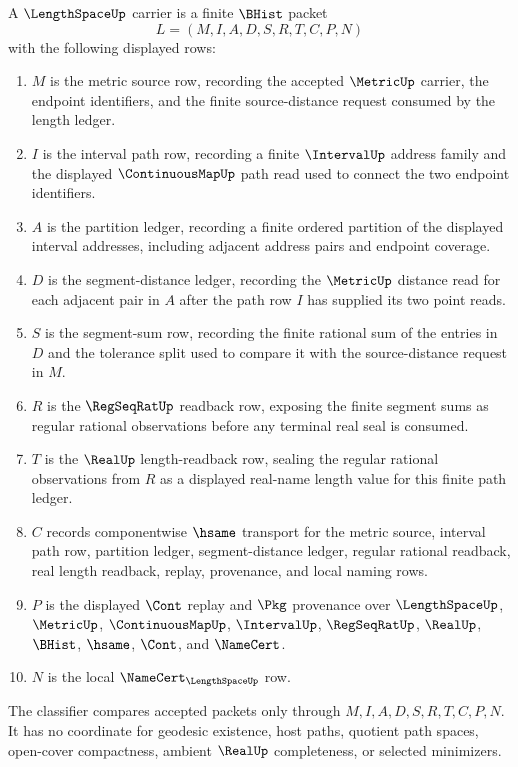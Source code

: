 \begin{definition}
\label{def:length-space-carrier}
A $\LengthSpaceUp$ carrier is a finite $\BHist$ packet
$$
L=(M,I,A,D,S,R,T,C,P,N)
$$
with the following displayed rows:
\begin{enumerate}
\item $M$ is the metric source row, recording the accepted $\MetricUp$ carrier, the endpoint identifiers, and the finite source-distance request consumed by the length ledger.
\item $I$ is the interval path row, recording a finite $\IntervalUp$ address family and the displayed $\ContinuousMapUp$ path read used to connect the two endpoint identifiers.
\item $A$ is the partition ledger, recording a finite ordered partition of the displayed interval addresses, including adjacent address pairs and endpoint coverage.
\item $D$ is the segment-distance ledger, recording the $\MetricUp$ distance read for each adjacent pair in $A$ after the path row $I$ has supplied its two point reads.
\item $S$ is the segment-sum row, recording the finite rational sum of the entries in $D$ and the tolerance split used to compare it with the source-distance request in $M$.
\item $R$ is the $\RegSeqRatUp$ readback row, exposing the finite segment sums as regular rational observations before any terminal real seal is consumed.
\item $T$ is the $\RealUp$ length-readback row, sealing the regular rational observations from $R$ as a displayed real-name length value for this finite path ledger.
\item $C$ records componentwise $\hsame$ transport for the metric source, interval path row, partition ledger, segment-distance ledger, regular rational readback, real length readback, replay, provenance, and local naming rows.
\item $P$ is the displayed $\Cont$ replay and $\Pkg$ provenance over $\LengthSpaceUp$, $\MetricUp$, $\ContinuousMapUp$, $\IntervalUp$, $\RegSeqRatUp$, $\RealUp$, $\BHist$, $\hsame$, $\Cont$, and $\NameCert$.
\item $N$ is the local $\NameCert_{\LengthSpaceUp}$ row.
\end{enumerate}
The classifier compares accepted packets only through $M,I,A,D,S,R,T,C,P,N$. It has no coordinate for geodesic existence, host paths, quotient path spaces, open-cover compactness, ambient $\RealUp$ completeness, or selected minimizers.
\end{definition}

